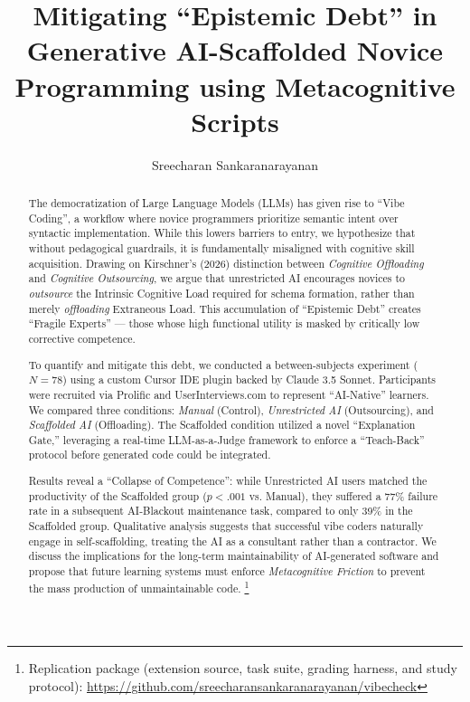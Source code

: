\documentclass[sigconf]{acmart}
\begin{document}
\title[Mitigating ``Epistemic Debt'' in GenAI-Scaffolded Novice Programming]{Mitigating ``Epistemic Debt'' in Generative AI-Scaffolded Novice Programming using Metacognitive Scripts}

\author{Sreecharan Sankaranarayanan}

\begin{abstract}
The democratization of Large Language Models (LLMs) has given rise to ``Vibe Coding'', a workflow where novice programmers prioritize semantic intent over syntactic implementation. While this lowers barriers to entry, we hypothesize that without pedagogical guardrails, it is fundamentally misaligned with cognitive skill acquisition. Drawing on Kirschner's (2026) distinction between \textit{Cognitive Offloading} and \textit{Cognitive Outsourcing}, we argue that unrestricted AI encourages novices to \textit{outsource} the Intrinsic Cognitive Load required for schema formation, rather than merely \textit{offloading} Extraneous Load. This accumulation of ``Epistemic Debt'' creates ``Fragile Experts'' — those whose high functional utility is masked by critically low corrective competence.

To quantify and mitigate this debt, we conducted a between-subjects experiment ($N=78$) using a custom Cursor IDE plugin backed by Claude 3.5 Sonnet. Participants were recruited via Prolific and UserInterviews.com to represent ``AI-Native'' learners. We compared three conditions: \textit{Manual} (Control), \textit{Unrestricted AI} (Outsourcing), and \textit{Scaffolded AI} (Offloading). The Scaffolded condition utilized a novel ``Explanation Gate,'' leveraging a real-time LLM-as-a-Judge framework to enforce a ``Teach-Back'' protocol before generated code could be integrated.

Results reveal a ``Collapse of Competence'': while Unrestricted AI users matched the productivity of the Scaffolded group ($p < .001$ vs. Manual), they suffered a 77\% failure rate in a subsequent AI-Blackout maintenance task, compared to only 39\% in the Scaffolded group. Qualitative analysis suggests that successful vibe coders naturally engage in self-scaffolding, treating the AI as a consultant rather than a contractor. We discuss the implications for the long-term maintainability of AI-generated software and propose that future learning systems must enforce \textit{Metacognitive Friction} to prevent the mass production of unmaintainable code. \footnote{Replication package (extension source, task suite, grading harness, and study protocol): \url{https://github.com/sreecharansankaranarayanan/vibecheck}}
\end{abstract}
\end{document}
